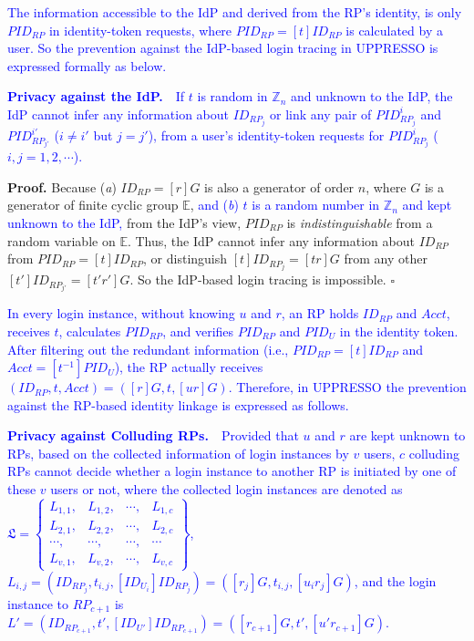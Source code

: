 {{\textcolor{blue}{The information accessible to the IdP and derived from the RP's identity,
    is only $PID_{RP}$ in identity-token requests, where $PID_{RP} = [t]ID_{RP}$ is calculated by a user.
So the prevention against the IdP-based login tracing in UPPRESSO
    is expressed formally as below.}

\vspace{1mm}
\noindent\textcolor{blue}{\textbf{Privacy against the IdP.}~~If $t$ is random in $\mathbb{Z}_n$ and unknown to the IdP,
the IdP
 cannot infer any information about $ID_{RP_j}$ or link any pair of $PID_{RP_j}^i$ and $PID_{RP_{j'}}^{i'}$
  ($i \neq i'$ but $j = j'$),
    from a user's identity-token requests for $PID_{RP_j}^i$ ($i,j = 1, 2, \cdots$).}

\vspace{0.75mm}
\noindent\textbf{Proof.}
Because (\emph{a}) $ID_{RP} = [r]G$ is also a generator of order $n$,
        where $G$ is a generator of finite cyclic group $\mathbb{E}$,
    \textcolor{blue}{and (\emph{b}) $t$ is a random number in $\mathbb{Z}_n$ and kept unknown to the IdP,}
 from the IdP's view,
 $PID_{RP}$
is \emph{indistinguishable} from a random variable on $\mathbb{E}$.
Thus,
    the IdP cannot infer any information about $ID_{RP}$ from $PID_{RP} = [t]ID_{RP}$,
or distinguish $[t]ID_{RP_j} = [tr]G$ from any other $[t']ID_{RP_{j'}} = [t'r']G$.
So the IdP-based login tracing is impossible. $\square$

\vspace{1mm}
\textcolor{blue}{In every login instance,
    without knowing $u$ and $r$,
    an RP holds $ID_{RP}$ and $Acct$, receives $t$, calculates $PID_{RP}$,
    and verifies $PID_{RP}$ and $PID_U$ in the identity token.
After filtering out the redundant information (i.e., $PID_{RP}= [t]{ID_{RP}}$ and $Acct = [t^{-1}]PID_{U}$),
    the RP actually receives $(ID_{RP}, t, Acct) = ([r]G, t, [ur]G)$.
Therefore, in UPPRESSO the prevention against the RP-based identity linkage is expressed as follows.}

\vspace{1mm}
\noindent\textcolor{blue}{\textbf{Privacy against Colluding RPs.}~~Provided that $u$ and $r$ are kept unknown to RPs,
based on the collected information of login instances by $v$ users,
$c$ colluding RPs cannot decide whether a login instance to another RP is initiated by one of these $v$ users or not,
    where
    the collected login instances are denoted as $\mathfrak{L}=\left\{ \begin{matrix}
L_{1,1}, & L_{1,2}, & \cdots, & L_{1,c}\\
L_{2,1}, & L_{2,2}, & \cdots, & L_{2,c}\\
\cdots, & \cdots, & \cdots, & \cdots\\
L_{v,1}, & L_{v,2}, & \cdots, & L_{v,c}
\end{matrix}\right\}$, $L_{i, j} = (ID_{RP_j}, t_{i, j}, [ID_{U_i}]{ID_{RP_j}}) = ([r_j]G, t_{i,j}, [u_ir_j]G)$,
    and the login instance to $RP_{c+1}$ is $L'=(ID_{RP_{c+1}}, t', [ID_{U'}]ID_{RP_{c+1}}) = ([r_{c+1}]G, t', [u'r_{c+1}]G)$.}


}}

